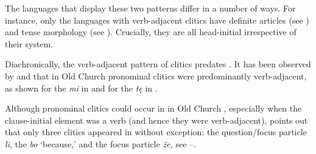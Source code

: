 \documentclass[output=paper,modfonts,newtxmath,hidelinks]{langscibook}
\begin{document}
\ea \label{11:ex7}
	\label{11:ex7a}
 	\label{11:ex7b}
 	\z
\z
The  languages that display these two  patterns differ in a number of ways. For instance, only the languages with verb-adjacent clitics have definite articles (see \citealt{boskovic2016}) and tense morphology (see \citealt{migdalski2015,migdalski2016}). Crucially, they are all head-initial irrespective of their  system.

Diachronically, the verb-adjacent pattern of clitics predates . It has been observed by \citet{radanovickocic1988} and \citet{pancheva2005} that in Old Church  pronominal clitics were predominantly verb-adjacent, as shown for the   \textit{mi} in  and for the   \textit{tę} in .

\ea \label{11:ex8}
	\label{11:ex8a}
	\label{11:ex8b}
	\z
\z
Although pronominal clitics could occur in  in Old Church , especially when the clause-initial element was a verb (and hence they were verb-adjacent), \citet{radanovickocic1988} points out that only three clitics appeared in  without exception: the question/focus particle \textit{li}, the   \textit{bo} ‘because,’ and the focus particle \textit{že,} see --. 
\end{document}
